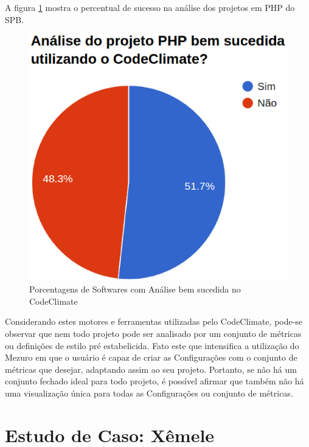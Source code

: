 A figura \ref{fig:is_codeclimate_php_success} mostra o percentual de sucesso na
análise dos projetos em PHP do SPB.

\begin{figure}[!htb]
	\centering
    \includegraphics[keepaspectratio=true,scale=0.6]
    {figuras/is_codeclimate_php_success.eps}
  \caption{Porcentagens de Softwares com Análise bem sucedida no CodeClimate}
  \label{fig:is_codeclimate_php_success}
\end{figure}

\newpage

Considerando estes motores e ferramentas utilizadas pelo CodeClimate, pode-se
observar que nem todo projeto pode ser analisado por um conjunto de métricas ou
definições de estilo pré estabelicida. Fato este que intensifica a utilização do
Mezuro em que o usuário é capaz de criar as Configurações com o conjunto de
métricas que desejar, adaptando assim ao seu projeto. Portanto, se não há um
conjunto fechado ideal para todo projeto, é possível afirmar que também não há
uma visualização única para todas as Configurações ou conjunto de métricas.


\section{Estudo de Caso: Xêmele}

